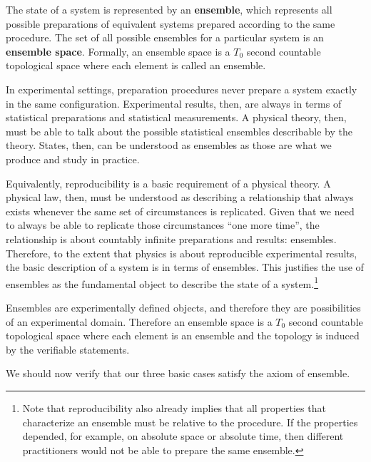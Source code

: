 \begin{mathSection}
	\begin{axiom} 
		The state of a system is represented by an \textbf{ensemble}, which represents all possible preparations of equivalent systems prepared according to the same procedure. The set of all possible ensembles for a particular system is an \textbf{ensemble space}. Formally, an ensemble space is a $T_0$ second countable topological space where each element is called an ensemble.
	\end{axiom}
	
	\begin{justification}
		In experimental settings, preparation procedures never prepare a system exactly in the same configuration. Experimental results, then, are always in terms of statistical preparations and statistical measurements. A physical theory, then, must be able to talk about the possible statistical ensembles describable by the theory. States, then, can be understood as ensembles as those are what we produce and study in practice.
		
		Equivalently, reproducibility is a basic requirement of a physical theory. A physical law, then, must be understood as describing a relationship that always exists whenever the same set of circumstances is replicated. Given that we need to always be able to replicate those circumstances ``one more time'', the relationship is about countably infinite preparations and results: ensembles. Therefore, to the extent that physics is about reproducible experimental results, the basic description of a system is in terms of ensembles. This justifies the use of ensembles as the fundamental object to describe the state of a system.\footnote{Note that reproducibility also already implies that all properties that characterize an ensemble must be relative to the procedure. If the properties depended, for example, on absolute space or absolute time, then different practitioners would not be able to prepare the same ensemble.}
		
		Ensembles are experimentally defined objects, and therefore they are possibilities of an experimental domain. Therefore an ensemble space is a $T_0$ second countable topological space where each element is an ensemble and the topology is induced by the verifiable statements.
	\end{justification}
\end{mathSection}

We should now verify that our three basic cases satisfy the axiom of ensemble.

